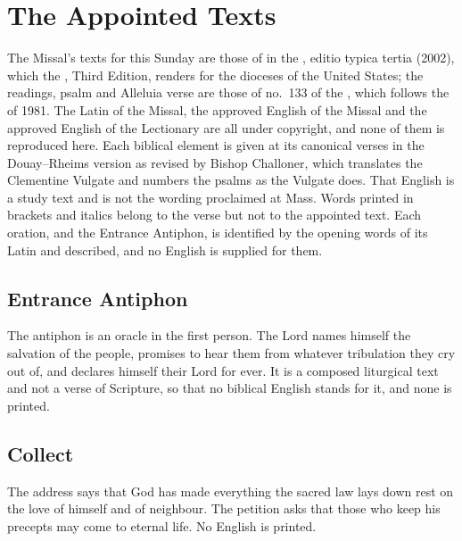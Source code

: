 \section{The Appointed Texts}
\label{sec:appointed-texts}

The Missal's texts for this Sunday are those of  in the , editio typica tertia (2002), which the
, Third Edition, renders for the dioceses of the United
States; the readings, psalm and Alleluia verse are those of no.~133 of the
, which follows the  of
1981. The Latin of the Missal, the approved English of the Missal and the
approved English of the Lectionary are all under copyright, and none of them
is reproduced here. Each biblical element is given at its canonical verses in
the Douay--Rheims version as revised by Bishop Challoner, which translates the
Clementine Vulgate and numbers the psalms as the Vulgate does. That English is
a study text and is not the wording proclaimed at Mass. Words printed in
brackets and italics belong to the verse but not to the appointed text. Each
oration, and the Entrance Antiphon, is identified by the opening words of its
Latin and described, and no English is supplied for them.

\subsection{Entrance Antiphon}
\label{proper-entrance-antiphon}


\noindent The antiphon is an oracle in the first person. The Lord names
himself the salvation of the people, promises to hear them from whatever
tribulation they cry out of, and declares himself their Lord for ever. It is a
composed liturgical text and not a verse of Scripture, so that no biblical
English stands for it, and none is printed.

\subsection{Collect}
\label{proper-collect}


\noindent The address says that God has made everything the sacred law lays
down rest on the love of himself and of neighbour. The petition asks that
those who keep his precepts may come to eternal life. No English is printed.

